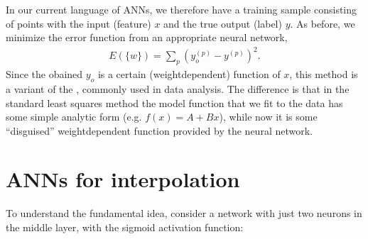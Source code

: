 \documentclass[letterpaper,10pt,english]{jupyterBook}
\begin{document}
\begin{sphinxVerbatim}[commandchars=\\\{\}]
\PYG{p}{[}    \PYG{p}{]}    
                   
                     
\end{sphinxVerbatim}

\noindent{}

\sphinxAtStartPar
In our current language of ANNs, we therefore have a training sample consisting of points with the input (feature) \(x\) and the true output (label) \(y\). As before, we minimize the error function from an appropriate neural network,
\begin{equation*}
\begin{split}E(\{w \}) = \sum_p (y_o^{(p)} - y^{(p)})^2. \end{split}
\end{equation*}
\sphinxAtStartPar
Since the obained \(y_o\) is a certain (weight\sphinxhyphen{}dependent) function of \(x\), this method is a variant of the , commonly used in data analysis. The difference is that in the standard least squares method the model function that we fit to the data has some simple analytic form (e.g. \( f(x) = A + B x\)), while now it is some “disguised” weight\sphinxhyphen{}dependent function provided by the neural network.


\section{ANNs for interpolation}
\label{\detokenize{docs/interpol:anns-for-interpolation}}
\sphinxAtStartPar
To understand the fundamental idea, consider a network with just two neurons in the middle layer, with the sigmoid activation function:

\noindent{}
\end{document}

